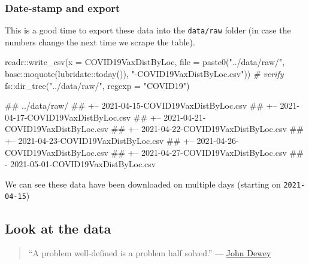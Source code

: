 \documentclass[11pt,]{article}
\newenvironment{Shaded}{\begin{snugshade}}{\end{snugshade}}
\newcommand{\AttributeTok}[1]{\textcolor[rgb]{0.77,0.63,0.00}{#1}}
\newcommand{\CommentTok}[1]{\textcolor[rgb]{0.56,0.35,0.01}{\textit{#1}}}
\newcommand{\FunctionTok}[1]{\textcolor[rgb]{0.00,0.00,0.00}{#1}}
\newcommand{\NormalTok}[1]{#1}
\newcommand{\SpecialCharTok}[1]{\textcolor[rgb]{0.00,0.00,0.00}{#1}}
\newcommand{\StringTok}[1]{\textcolor[rgb]{0.31,0.60,0.02}{#1}}
\let\oldShaded\Shaded
\let\endoldShaded\endShaded
\renewenvironment{Shaded}{\footnotesize\oldShaded}{\endoldShaded}
\let\oldverbatim\verbatim
\let\endoldverbatim\endverbatim
\renewenvironment{verbatim}{\footnotesize\oldverbatim}{\endoldverbatim}
\begin{document}
\hypertarget{date-stamp-and-export}{%
\subsubsection{Date-stamp and export}\label{date-stamp-and-export}}

This is a good time to export these data into the \texttt{data/raw}
folder (in case the numbers change the next time we scrape the table).

\begin{Shaded}
\begin{Highlighting}[]
\NormalTok{readr}\SpecialCharTok{::}\FunctionTok{write\_csv}\NormalTok{(}\AttributeTok{x =}\NormalTok{ COVID19VaxDistByLoc, }
                 \AttributeTok{file =} \FunctionTok{paste0}\NormalTok{(}\StringTok{"../data/raw/"}\NormalTok{, }
\NormalTok{                               base}\SpecialCharTok{::}\FunctionTok{noquote}\NormalTok{(lubridate}\SpecialCharTok{::}\FunctionTok{today}\NormalTok{()),}
                 \StringTok{"{-}COVID19VaxDistByLoc.csv"}\NormalTok{))}
\CommentTok{\# verify}
\NormalTok{fs}\SpecialCharTok{::}\FunctionTok{dir\_tree}\NormalTok{(}\StringTok{"../data/raw/"}\NormalTok{, }\AttributeTok{regexp =} \StringTok{"COVID19"}\NormalTok{)}
\end{Highlighting}
\end{Shaded}

\begin{verbatim}
## ../data/raw/
## +-- 2021-04-15-COVID19VaxDistByLoc.csv
## +-- 2021-04-17-COVID19VaxDistByLoc.csv
## +-- 2021-04-21-COVID19VaxDistByLoc.csv
## +-- 2021-04-22-COVID19VaxDistByLoc.csv
## +-- 2021-04-23-COVID19VaxDistByLoc.csv
## +-- 2021-04-26-COVID19VaxDistByLoc.csv
## +-- 2021-04-27-COVID19VaxDistByLoc.csv
## \-- 2021-05-01-COVID19VaxDistByLoc.csv
\end{verbatim}

We can see these data have been downloaded on multiple days (starting on
\texttt{2021-04-15})

\hypertarget{look-at-the-data}{%
\subsection{Look at the data}\label{look-at-the-data}}

\begin{quote}
``A problem well-defined is a problem half solved.'' ―
\href{https://www.goodreads.com/quotes/7702317-a-problem-well-defined-is-a-problem-half-solved\#}{John
Dewey}
\end{quote}
\end{document}
